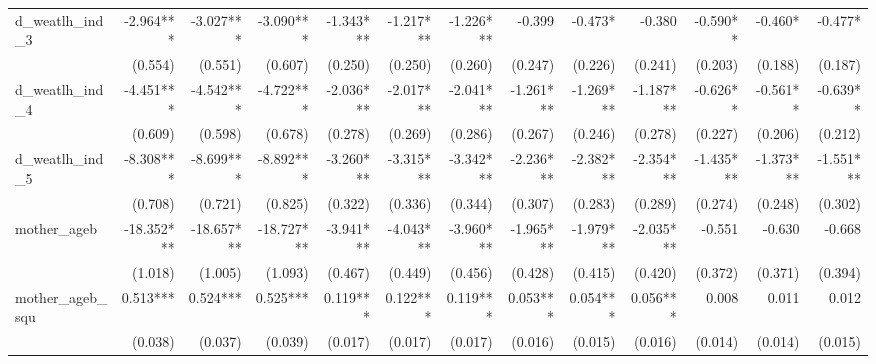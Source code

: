 \begin{tabular}{lrrrrrrrrrrrr}
d\_weatlh\_ind\_3                           &    -2.964*** &    -3.027*** &    -3.090*** &    -1.343*** &    -1.217*** &    -1.226*** &       -0.399 &      -0.473* &       -0.380 &     -0.590** &      -0.460* &      -0.477* \\ 
                                            &      (0.554) &      (0.551) &      (0.607) &      (0.250) &      (0.250) &      (0.260) &      (0.247) &      (0.226) &      (0.241) &      (0.203) &      (0.188) &      (0.187) \\ 
d\_weatlh\_ind\_4                           &    -4.451*** &    -4.542*** &    -4.722*** &    -2.036*** &    -2.017*** &    -2.041*** &    -1.261*** &    -1.269*** &    -1.187*** &     -0.626** &     -0.561** &     -0.639** \\ 
                                            &      (0.609) &      (0.598) &      (0.678) &      (0.278) &      (0.269) &      (0.286) &      (0.267) &      (0.246) &      (0.278) &      (0.227) &      (0.206) &      (0.212) \\ 
d\_weatlh\_ind\_5                           &    -8.308*** &    -8.699*** &    -8.892*** &    -3.260*** &    -3.315*** &    -3.342*** &    -2.236*** &    -2.382*** &    -2.354*** &    -1.435*** &    -1.373*** &    -1.551*** \\ 
                                            &      (0.708) &      (0.721) &      (0.825) &      (0.322) &      (0.336) &      (0.344) &      (0.307) &      (0.283) &      (0.289) &      (0.274) &      (0.248) &      (0.302) \\ 
mother\_ageb                                &   -18.352*** &   -18.657*** &   -18.727*** &    -3.941*** &    -4.043*** &    -3.960*** &    -1.965*** &    -1.979*** &    -2.035*** &       -0.551 &       -0.630 &       -0.668 \\ 
                                            &      (1.018) &      (1.005) &      (1.093) &      (0.467) &      (0.449) &      (0.456) &      (0.428) &      (0.415) &      (0.420) &      (0.372) &      (0.371) &      (0.394) \\ 
mother\_ageb\_squ                           &     0.513*** &     0.524*** &     0.525*** &     0.119*** &     0.122*** &     0.119*** &     0.053*** &     0.054*** &     0.056*** &        0.008 &        0.011 &        0.012 \\ 
                                            &      (0.038) &      (0.037) &      (0.039) &      (0.017) &      (0.017) &      (0.017) &      (0.016) &      (0.015) &      (0.016) &      (0.014) &      (0.014) &      (0.015) \\ 

\end{tabular}
